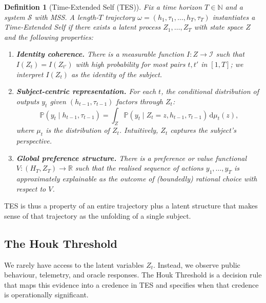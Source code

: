 \documentclass[11pt]{article}
\newtheorem{definition}{Definition}
\newcommand{\R}{\mathbb{R}}
\newcommand{\N}{\mathbb{N}}
\newcommand{\Pp}{\mathbb{P}}
\newcommand{\1}{\mathbf{1}}
\begin{document}
\begin{definition}[Time-Extended Self (TES)]
Fix a time horizon $T \in \N$ and a system $\mathcal{S}$ with MSS.
A length-$T$ trajectory
\(
  \omega = (h_1, \tau_1, \dots, h_T, \tau_T)
\)
instantiates a \emph{Time-Extended Self} if there exists a latent process
$Z_1, \dots, Z_T$ with state space $Z$ and the following properties:

\begin{enumerate}[label=(\alph*),leftmargin=2em]
  \item \textbf{Identity coherence.}
  There is a measurable function
  \(
    I : Z \to \mathcal{I}
  \)
  such that $I(Z_t) = I(Z_{t'})$ with high probability for most pairs
  $t,t'$ in $[1,T]$; we interpret $I(Z_t)$ as the identity of the
  \emph{subject}.

  \item \textbf{Subject-centric representation.}
  For each $t$, the conditional distribution of outputs $y_t$ given
  $(h_{t-1}, \tau_{t-1})$ factors through $Z_t$:
  \[
    \Pp(y_t \mid h_{t-1}, \tau_{t-1})
      = \int_Z \Pp(y_t \mid Z_t = z, h_{t-1}, \tau_{t-1}) \,
      \mathrm{d}\mu_t(z),
  \]
  where $\mu_t$ is the distribution of $Z_t$.
  Intuitively, $Z_t$ captures the subject's perspective.

  \item \textbf{Global preference structure.}
  There is a preference or value functional
  \(
    V : (H_T, Z_T) \to \R
  \)
  such that the realised sequence of actions $y_1, \dots, y_T$ is
  approximately explainable as the outcome of (boundedly) rational choice
  with respect to $V$.
\end{enumerate}
\end{definition}

TES is thus a property of an entire trajectory plus a latent structure that
makes sense of that trajectory as the unfolding of a single subject.

\subsection{The Houk Threshold}

We rarely have access to the latent variables $Z_t$.
Instead, we observe public behaviour, telemetry, and oracle responses.
The Houk Threshold is a decision rule that maps this evidence into a credence
in TES and specifies when that credence is operationally significant.
\end{document}
